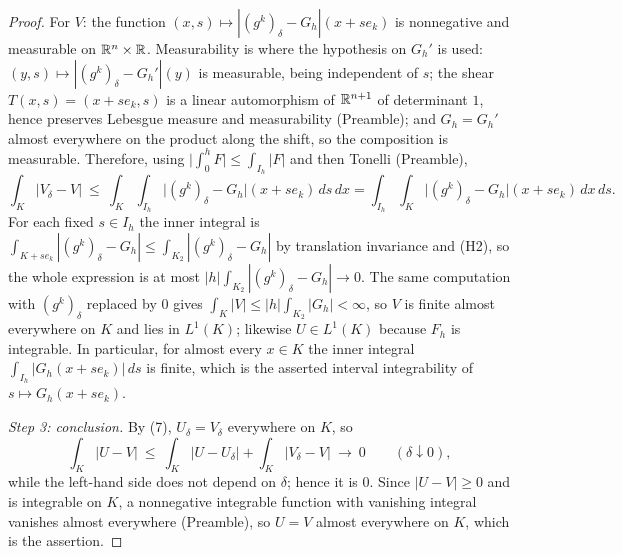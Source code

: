 \begin{proof}
For $V$: the function $(x,s)\mapsto|(g^k)_\delta-G_h|(x+se_k)$ is nonnegative
and measurable on $\mathbb{R}^n\times\mathbb{R}$.  Measurability is where the hypothesis on
$G_h'$ is used: $(y,s)\mapsto|(g^k)_\delta-G_h'|(y)$ is measurable, being
independent of $s$; the shear $T(x,s)=(x+se_k,s)$ is a linear automorphism of
$\mathbb{R}^{n+1}$ of determinant $1$, hence preserves Lebesgue measure and
measurability (Preamble); and $G_h=G_h'$ almost everywhere on the product along
the shift, so the composition is measurable.  Therefore, using
$\bigl|\int_0^hF\bigr|\le\int_{I_h}|F|$ and then Tonelli (Preamble),
\[
\int_K|V_\delta-V|
\ \le\ \int_K\!\!\int_{I_h}\bigl|(g^k)_\delta-G_h\bigr|(x+se_k)\,ds\,dx
= \int_{I_h}\!\!\int_K\bigl|(g^k)_\delta-G_h\bigr|(x+se_k)\,dx\,ds .
\]
For each fixed $s\in I_h$ the inner integral is
$\int_{K+se_k}|(g^k)_\delta-G_h|\le\int_{K_2}|(g^k)_\delta-G_h|$ by translation
invariance and (H2), so the whole expression is at most
$|h|\int_{K_2}|(g^k)_\delta-G_h|\to0$.  The same computation with
$(g^k)_\delta$ replaced by $0$ gives $\int_K|V|\le|h|\int_{K_2}|G_h|<\infty$, so
$V$ is finite almost everywhere on $K$ and lies in $L^1(K)$; likewise
$U\in L^1(K)$ because $F_h$ is integrable.  In particular, for almost every
$x\in K$ the inner integral $\int_{I_h}|G_h(x+se_k)|\,ds$ is finite, which is
the asserted interval integrability of $s\mapsto G_h(x+se_k)$.

\emph{Step 3: conclusion.}  By (7), $U_\delta=V_\delta$ everywhere on $K$, so
\[
\int_K|U-V|\ \le\ \int_K|U-U_\delta|+\int_K|V_\delta-V|\ \longrightarrow\ 0
\qquad(\delta\downarrow0),
\]
while the left-hand side does not depend on $\delta$; hence it is $0$.  Since
$|U-V|\ge0$ and is integrable on $K$, a nonnegative integrable function with
vanishing integral vanishes almost everywhere (Preamble), so $U=V$ almost
everywhere on $K$, which is the assertion.
\end{proof}
